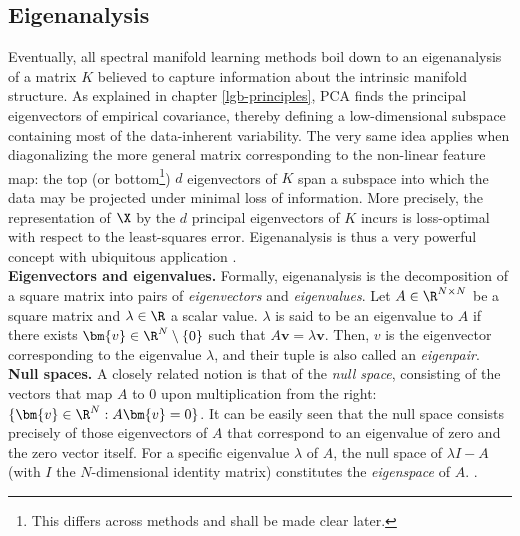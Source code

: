 \subsection{Eigenanalysis}
\label{eigenanalysis}

Eventually, all spectral manifold learning methods boil down to an eigenanalysis 
of a matrix $K$ believed to capture information about the intrinsic manifold 
structure.
As explained in chapter \ref{lgb-principles}, PCA finds the principal 
eigenvectors of empirical covariance, thereby defining a low-dimensional 
subspace containing most of the data-inherent variability.
The very same idea applies when diagonalizing the more general matrix 
corresponding to the non-linear feature map: the top (or bottom\footnote{
This differs across methods and shall be made clear later.
}) $d$ eigenvectors of $K$ span a subspace into which the data may be projected 
under minimal loss of information.
More precisely, the representation of $\X$ by the $d$ principal eigenvectors of 
$K$ incurs is loss-optimal with respect to the least-squares error.
Eigenanalysis is thus a very powerful concept with ubiquitous application 
\citep{schoelkopfetal1998}.
\\

\textbf{Eigenvectors and eigenvalues.} Formally, eigenanalysis is the 
decomposition of a square matrix into pairs of \textit{eigenvectors} and 
\textit{eigenvalues}.
Let $A \in \R^{N \times N}$ be a square matrix and $\lambda \in \R$ a scalar 
value. 
$\lambda$ is said to be an eigenvalue to $A$ if there exists 
$\bm{v} \in \R^N \setminus \{0\}$ such that $A \bm{v} = \lambda \bm{v}$.
Then, $v$ is the eigenvector corresponding to the eigenvalue $\lambda$, and 
their tuple is also called an \textit{eigenpair}.
\\

\textbf{Null spaces.} A closely related notion is that of the 
\textit{null space}, consisting of the vectors that map $A$ to 0 upon 
multiplication from the right: $\{\bm{v} \in \R^N: A \bm{v} = 0\}$.
It can be easily seen that the null space consists precisely of those 
eigenvectors of $A$ that correspond to an eigenvalue of zero and the zero 
vector itself.
For a specific eigenvalue $\lambda$ of $A$, the null space of $\lambda I - A$ 
(with $I$ the $N$-dimensional identity matrix) constitutes the 
\textit{eigenspace} of $A$.
\citep{boermmehl2012}.
\\

